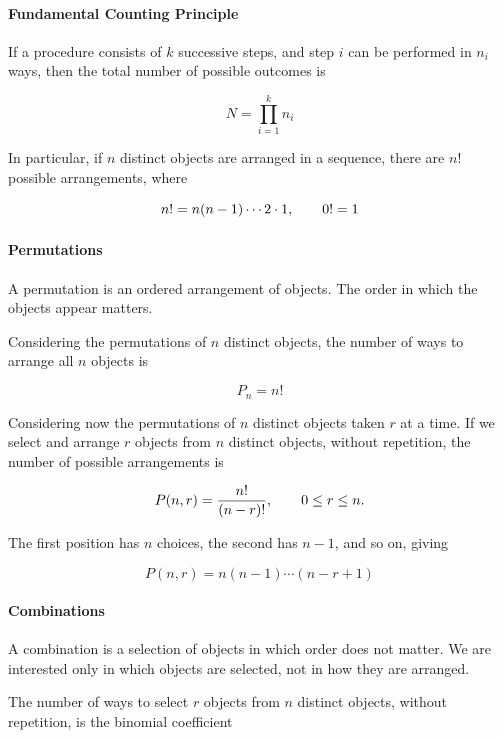 \documentclass{article}
\begin{document}
\paragraph{Fundamental Counting
Principle}\label{fundamental-counting-principle}

If a procedure consists of \(k\) successive steps, and step \(i\) can be
performed in \(n_i\) ways, then the total number of possible outcomes is

\[N = \prod_{i=1}^{k} n_i\]

In particular, if \(n\) distinct objects are arranged in a sequence,
there are \(n!\) possible arrangements, where

\[n! = n(n-1)\cdots 2\cdot 1, \\ \qquad 0! = 1\]

\paragraph{Permutations}\label{permutations}

A permutation is an ordered arrangement of objects. The order in which
the objects appear matters.

Considering the permutations of \(n\) distinct objects, the number of
ways to arrange all \(n\) objects is

\[P_n = n!\]

Considering now the permutations of \(n\) distinct objects taken \(r\)
at a time. If we select and arrange \(r\) objects from \(n\) distinct
objects, without repetition, the number of possible arrangements is

\[
    P(n,r) = \frac{n!}{(n-r)!}, \\
    \qquad 0 \leq r \leq n.
\]

The first position has \(n\) choices, the second has \(n-1\), and so on,
giving

\[P(n,r) = n(n-1)\cdots(n-r+1)\]

\paragraph{Combinations}\label{combinations}

A combination is a selection of objects in which order does not matter.
We are interested only in which objects are selected, not in how they
are arranged.

The number of ways to select \(r\) objects from \(n\) distinct objects,
without repetition, is the binomial coefficient
\end{document}
